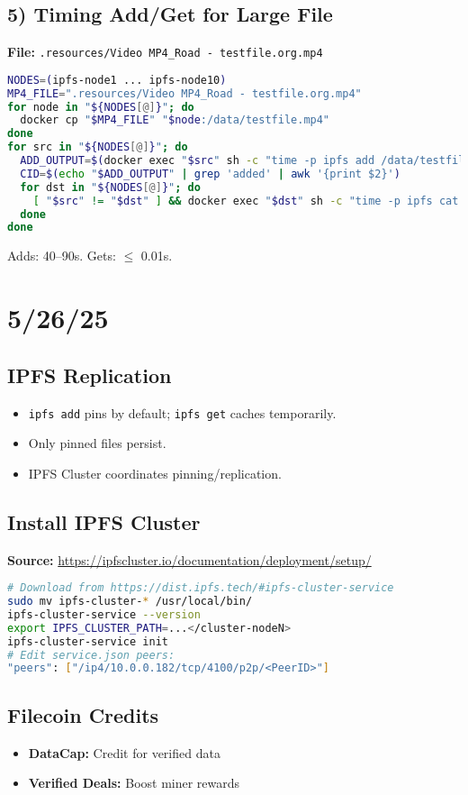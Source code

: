 \documentclass{article}
\begin{document}
\subsection*{5) Timing Add/Get for Large File}
\textbf{File:} \texttt{.resources/Video MP4\_Road - testfile.org.mp4}
\begin{lstlisting}[language=bash]
NODES=(ipfs-node1 ... ipfs-node10)
MP4_FILE=".resources/Video MP4_Road - testfile.org.mp4"
for node in "${NODES[@]}"; do
  docker cp "$MP4_FILE" "$node:/data/testfile.mp4"
done
for src in "${NODES[@]}"; do
  ADD_OUTPUT=$(docker exec "$src" sh -c "time -p ipfs add /data/testfile.mp4" 2>&1)
  CID=$(echo "$ADD_OUTPUT" | grep 'added' | awk '{print $2}')
  for dst in "${NODES[@]}"; do
    [ "$src" != "$dst" ] && docker exec "$dst" sh -c "time -p ipfs cat $CID > /dev/null"
  done
done
\end{lstlisting}
Adds: 40–90s. Gets: $\leq$ 0.01s.

\section*{5/26/25}

\subsection*{IPFS Replication}
\begin{itemize}
    \item \texttt{ipfs add} pins by default; \texttt{ipfs get} caches temporarily.
    \item Only pinned files persist.
    \item IPFS Cluster coordinates pinning/replication.
\end{itemize}

\subsection*{Install IPFS Cluster}
\textbf{Source:} \url{https://ipfscluster.io/documentation/deployment/setup/}
\begin{lstlisting}[language=bash]
# Download from https://dist.ipfs.tech/#ipfs-cluster-service
sudo mv ipfs-cluster-* /usr/local/bin/
ipfs-cluster-service --version
export IPFS_CLUSTER_PATH=...</cluster-nodeN>
ipfs-cluster-service init
# Edit service.json peers:
"peers": ["/ip4/10.0.0.182/tcp/4100/p2p/<PeerID>"]
\end{lstlisting}

\subsection*{Filecoin Credits}
\begin{itemize}
    \item \textbf{DataCap:} Credit for verified data
    \item \textbf{Verified Deals:} Boost miner rewards
\end{itemize}
\end{document}
